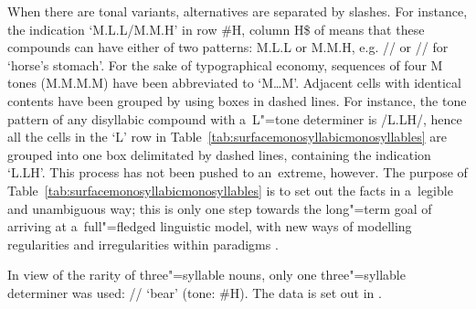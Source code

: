 When there are tonal variants, alternatives are separated by slashes. For instance, the indication
‘M.L.L/M.M.H’ in row \#H, column H\$ of  means that
these compounds can have either of two patterns: M.L.L or M.M.H, e.g. // or
// for ‘horse’s stomach’. For the sake of typographical economy, sequences of four M tones (M.M.M.M) have been
abbreviated to ‘M{\dots}M’. Adjacent cells with identical contents have been
grouped by using boxes in dashed lines. For instance, the tone pattern of any disyllabic compound with a~L"=tone determiner is /L.LH/, hence all the cells in the ‘L' row in Table~\ref{tab:surfacemonosyllabicmonosyllables} are grouped into one box delimitated by dashed lines, containing the indication ‘L.LH'. This process has not been pushed to an~extreme, however.
The purpose of Table~\ref{tab:surfacemonosyllabicmonosyllables} is to set out the facts in a~legible and unambiguous way; this is only one step towards the long"=term goal of arriving at a~full"=fledged linguistic model, with new ways of modelling regularities and irregularities within paradigms
\citep{sagotetal2013}. 

In view of the rarity of three"=syllable nouns, only one three"=syllable determiner was used:
// ‘bear’ (tone: \#H). The data is set out in
.


